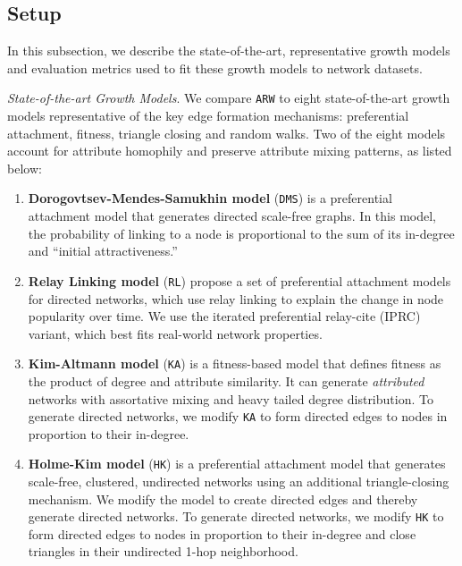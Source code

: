 \subsection{Setup}
\label{sub:Experimental Setup}

In this subsection, we describe the state-of-the-art, representative growth models
and evaluation metrics used to fit these growth models to network datasets.

\textit{State-of-the-art Growth Models}. We compare \texttt{ARW} to eight state-of-the-art
growth models representative of the key edge formation
mechanisms: preferential attachment, fitness, triangle closing and random walks.
Two of the eight models account for attribute homophily and preserve attribute mixing patterns,
as listed below:
\begin{enumerate}
	\item{\textbf{Dorogovtsev-Mendes-Samukhin model}} \cite{dorogovtsev2000structure}  (\texttt{DMS})
	is a preferential attachment model that generates directed scale-free graphs. In this model,
	the probability of linking to a node is proportional to the sum of its in-degree and ``initial attractiveness.''

	\item{\textbf{Relay Linking model}} \cite{singh2017relay} (\texttt{RL}) propose a set of
	preferential attachment models for directed networks, which use relay linking to explain the change in
	node popularity over time. We use the iterated preferential relay-cite (IPRC) variant, which best fits
	real-world network properties.

	\item{\textbf{Kim-Altmann model}} \cite{kim2017effect} (\texttt{KA}) is a fitness-based model that defines
	fitness as the product of degree and attribute similarity. It can generate \textit{attributed} networks
	with assortative mixing and heavy tailed degree distribution.
	To generate directed networks, we modify \texttt{KA} to form directed edges to nodes in proportion to their in-degree.

	\item{\textbf{Holme-Kim model}} \cite{holme2002growing} (\texttt{HK}) is a preferential attachment model
	that generates scale-free, clustered, undirected networks using an additional triangle-closing mechanism.
	We modify the model to create directed edges and thereby generate directed networks.
	To generate directed networks, we modify \texttt{HK} to form directed edges to nodes in proportion to their in-degree
	and close triangles in their undirected 1-hop neighborhood.



\end{enumerate}
